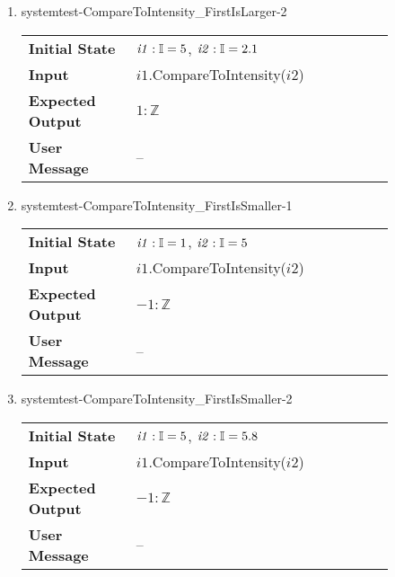 \begin{enumerate}
    \item{systemtest-CompareToIntensity\_FirstIsLarger-2}
    \begin{table}[H]
        \centering
        \begin{tabular}{P{0.25\linewidth}P{0.6\linewidth}}
            \toprule
            \textbf{Initial State} & $\mathit{i1} : \mathbb{I} = 5$,
            $\mathit{i2} : \mathbb{I} = 2.1$ \\
            \textbf{Input} & $\mathit{i1}$.CompareToIntensity($\mathit{i2}$) \\
            \midrule
            \textbf{Expected Output} & $1 : \mathbb{Z}$ \\
            \textbf{User Message} & -- \\ \bottomrule
        \end{tabular}
    \end{table}

    \item{systemtest-CompareToIntensity\_FirstIsSmaller-1}
    \begin{table}[H]
        \centering
        \begin{tabular}{P{0.25\linewidth}P{0.6\linewidth}}
            \toprule
            \textbf{Initial State} & $\mathit{i1} : \mathbb{I} = 1$,
            $\mathit{i2} : \mathbb{I} = 5$ \\
            \textbf{Input} & $\mathit{i1}$.CompareToIntensity($\mathit{i2}$) \\
            \midrule
            \textbf{Expected Output} & $-1 : \mathbb{Z}$ \\
            \textbf{User Message} & -- \\ \bottomrule
        \end{tabular}
    \end{table}

    \item{systemtest-CompareToIntensity\_FirstIsSmaller-2}
    \begin{table}[H]
        \centering
        \begin{tabular}{P{0.25\linewidth}P{0.6\linewidth}}
            \toprule
            \textbf{Initial State} & $\mathit{i1} : \mathbb{I} = 5$,
            $\mathit{i2} : \mathbb{I} = 5.8$ \\
            \textbf{Input} & $\mathit{i1}$.CompareToIntensity($\mathit{i2}$) \\
            \midrule
            \textbf{Expected Output} & $-1 : \mathbb{Z}$ \\
            \textbf{User Message} & -- \\ \bottomrule
        \end{tabular}
    \end{table}


\end{enumerate}
